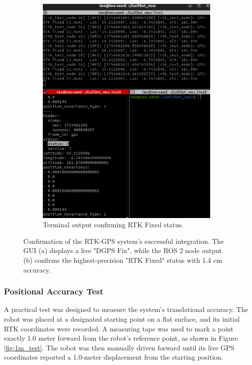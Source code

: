 \begin{figure}[h!]
\begin{subfigure}[b]{0.58\textwidth}
        \includegraphics[width=\textwidth]{figures/rtk_terminal_output.png} %
        \caption{Terminal output confirming RTK Fixed status.}
        \label{fig:rtk_terminal_sub}
    \end{subfigure}
    \caption[RTK-GPS System Integration and Fix Status.]
    {Confirmation of the RTK-GPS system's successful integration. The GUI (a) displays a live "DGPS Fix", while the ROS 2 node output (b) confirms the highest-precision "RTK Fixed" status with 1.4 cm accuracy.}
    \label{fig:gps_integration}
\end{figure}

\subsubsection{Positional Accuracy Test}
A practical test was designed to measure the system's translational accuracy. The robot was placed at a designated starting point on a flat surface, and its initial RTK coordinates were recorded. A measuring tape was used to mark a point exactly 1.0 meter forward from the robot's reference point, as shown in Figure \ref{fig:1m_test}. The robot was then manually driven forward until its live GPS coordinates reported a 1.0-meter displacement from the starting position.

